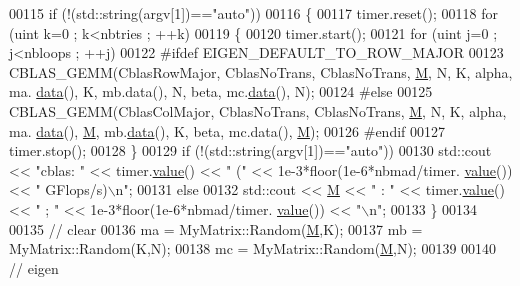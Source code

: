 \begin{DoxyCode}
{{{00115   \textcolor{keywordflow}{if} (!(std::string(argv[1])==\textcolor{stringliteral}{"auto"}))
00116   \{
00117     timer.reset();
00118     \textcolor{keywordflow}{for} (uint k=0 ; k<nbtries ; ++k)
00119     \{
00120         timer.start();
00121         \textcolor{keywordflow}{for} (uint j=0 ; j<nbloops ; ++j)
00122               #ifdef EIGEN\_DEFAULT\_TO\_ROW\_MAJOR
00123               CBLAS\_GEMM(CblasRowMajor, CblasNoTrans, CblasNoTrans, \hyperlink{group___core___module_class_eigen_1_1_matrix}{M}, N, K, alpha, ma.
      \hyperlink{class_eigen_1_1_plain_object_base_ac25699535374b1854cf8494e44ad31b2}{data}(), K, mb.data(), N, beta, mc.\hyperlink{class_eigen_1_1_plain_object_base_ac25699535374b1854cf8494e44ad31b2}{data}(), N);
00124 \textcolor{preprocessor}{              #else}
00125               CBLAS\_GEMM(CblasColMajor, CblasNoTrans, CblasNoTrans, \hyperlink{group___core___module_class_eigen_1_1_matrix}{M}, N, K, alpha, ma.
      \hyperlink{class_eigen_1_1_plain_object_base_ac25699535374b1854cf8494e44ad31b2}{data}(), \hyperlink{group___core___module_class_eigen_1_1_matrix}{M}, mb.\hyperlink{class_eigen_1_1_plain_object_base_ac25699535374b1854cf8494e44ad31b2}{data}(), K, beta, mc.data(), \hyperlink{group___core___module_class_eigen_1_1_matrix}{M});
00126 \textcolor{preprocessor}{              #endif}
00127         timer.stop();
00128     \}
00129     \textcolor{keywordflow}{if} (!(std::string(argv[1])==\textcolor{stringliteral}{"auto"}))
00130       std::cout << \textcolor{stringliteral}{"cblas: "} << timer.\hyperlink{class_eigen_1_1_bench_timer_a26760f963ed8b64c126159bfea57735e}{value}() << \textcolor{stringliteral}{" ("} << 1e-3*floor(1e-6*nbmad/timer.
      \hyperlink{class_eigen_1_1_bench_timer_a26760f963ed8b64c126159bfea57735e}{value}()) << \textcolor{stringliteral}{" GFlops/s)\(\backslash\)n"};
00131     \textcolor{keywordflow}{else}
00132         std::cout << \hyperlink{group___core___module_class_eigen_1_1_matrix}{M} << \textcolor{stringliteral}{" : "} << timer.\hyperlink{class_eigen_1_1_bench_timer_a26760f963ed8b64c126159bfea57735e}{value}() << \textcolor{stringliteral}{" ; "} << 1e-3*floor(1e-6*nbmad/timer.
      \hyperlink{class_eigen_1_1_bench_timer_a26760f963ed8b64c126159bfea57735e}{value}()) << \textcolor{stringliteral}{"\(\backslash\)n"};
00133   \}
00134 
00135   \textcolor{comment}{// clear}
00136   ma = MyMatrix::Random(\hyperlink{group___core___module_class_eigen_1_1_matrix}{M},K);
00137   mb = MyMatrix::Random(K,N);
00138   mc = MyMatrix::Random(\hyperlink{group___core___module_class_eigen_1_1_matrix}{M},N);
00139 
00140   \textcolor{comment}{// eigen}
}}}
\end{DoxyCode}

